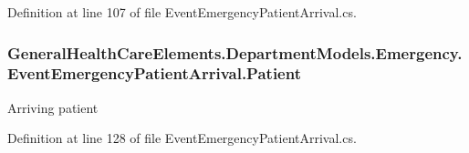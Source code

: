 Definition at line 107 of file Event\+Emergency\+Patient\+Arrival.\+cs.

\subsubsection[{\texorpdfstring{Patient}{Patient}}]{ General\+Health\+Care\+Elements.\+Department\+Models.\+Emergency.\+Event\+Emergency\+Patient\+Arrival.\+Patient\hspace{0.3cm}{\ttfamily [get]}}\hypertarget{class_general_health_care_elements_1_1_department_models_1_1_emergency_1_1_event_emergency_patient_arrival_ac8efab793cad081366e8c4c7749687cd}{}\label{class_general_health_care_elements_1_1_department_models_1_1_emergency_1_1_event_emergency_patient_arrival_ac8efab793cad081366e8c4c7749687cd}


Arriving patient 



Definition at line 128 of file Event\+Emergency\+Patient\+Arrival.\+cs.

